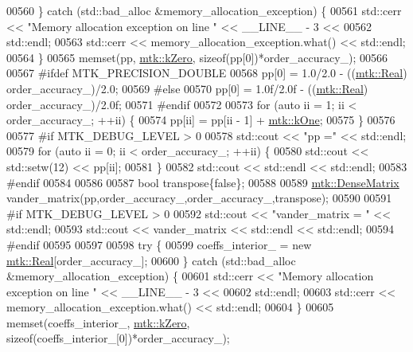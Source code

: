 \begin{DoxyCode}
{{00560   \} \textcolor{keywordflow}{catch} (std::bad\_alloc &memory\_allocation\_exception) \{
00561     std::cerr << \textcolor{stringliteral}{"Memory allocation exception on line "} << \_\_LINE\_\_ - 3 <<
00562       std::endl;
00563     std::cerr << memory\_allocation\_exception.what() << std::endl;
00564   \}
00565   memset(pp, \hyperlink{group__c01-roots_ga59a451a5fae30d59649bcda274fea271}{mtk::kZero}, \textcolor{keyword}{sizeof}(pp[0])*order\_accuracy\_);
00566 
00567 \textcolor{preprocessor}{  #ifdef MTK\_PRECISION\_DOUBLE}
00568   pp[0] = 1.0/2.0 - ((\hyperlink{group__c01-roots_gac080bbbf5cbb5502c9f00405f894857d}{mtk::Real}) order\_accuracy\_)/2.0;
00569 \textcolor{preprocessor}{  #else}
00570   pp[0] = 1.0f/2.0f - ((\hyperlink{group__c01-roots_gac080bbbf5cbb5502c9f00405f894857d}{mtk::Real}) order\_accuracy\_)/2.0f;
00571 \textcolor{preprocessor}{  #endif}
00572 
00573   \textcolor{keywordflow}{for} (\textcolor{keyword}{auto} ii = 1; ii < order\_accuracy\_; ++ii) \{
00574     pp[ii] = pp[ii - 1] + \hyperlink{group__c01-roots_ga26407c24d43b6b95480943340d285c71}{mtk::kOne};
00575   \}
00576 
00577 \textcolor{preprocessor}{  #if MTK\_DEBUG\_LEVEL > 0}
00578   std::cout << \textcolor{stringliteral}{"pp ="} << std::endl;
00579   \textcolor{keywordflow}{for} (\textcolor{keyword}{auto} ii = 0; ii < order\_accuracy\_; ++ii) \{
00580     std::cout << std::setw(12) << pp[ii];
00581   \}
00582   std::cout << std::endl << std::endl;
00583 \textcolor{preprocessor}{  #endif}
00584 
00586 
00587   \textcolor{keywordtype}{bool} transpose\{\textcolor{keyword}{false}\};
00588 
00589   \hyperlink{classmtk_1_1DenseMatrix}{mtk::DenseMatrix} vander\_matrix(pp,order\_accuracy\_,order\_accuracy\_,transpose);
00590 
00591 \textcolor{preprocessor}{  #if MTK\_DEBUG\_LEVEL > 0}
00592   std::cout << \textcolor{stringliteral}{"vander\_matrix = "} << std::endl;
00593   std::cout << vander\_matrix << std::endl << std::endl;
00594 \textcolor{preprocessor}{  #endif}
00595 
00597 
00598   \textcolor{keywordflow}{try} \{
00599     coeffs\_interior\_ = \textcolor{keyword}{new} \hyperlink{group__c01-roots_gac080bbbf5cbb5502c9f00405f894857d}{mtk::Real}[order\_accuracy\_];
00600   \} \textcolor{keywordflow}{catch} (std::bad\_alloc &memory\_allocation\_exception) \{
00601     std::cerr << \textcolor{stringliteral}{"Memory allocation exception on line "} << \_\_LINE\_\_ - 3 <<
00602       std::endl;
00603     std::cerr << memory\_allocation\_exception.what() << std::endl;
00604   \}
00605   memset(coeffs\_interior\_, \hyperlink{group__c01-roots_ga59a451a5fae30d59649bcda274fea271}{mtk::kZero}, \textcolor{keyword}{sizeof}(coeffs\_interior\_[0])*order\_accuracy\_);
}}
\end{DoxyCode}
